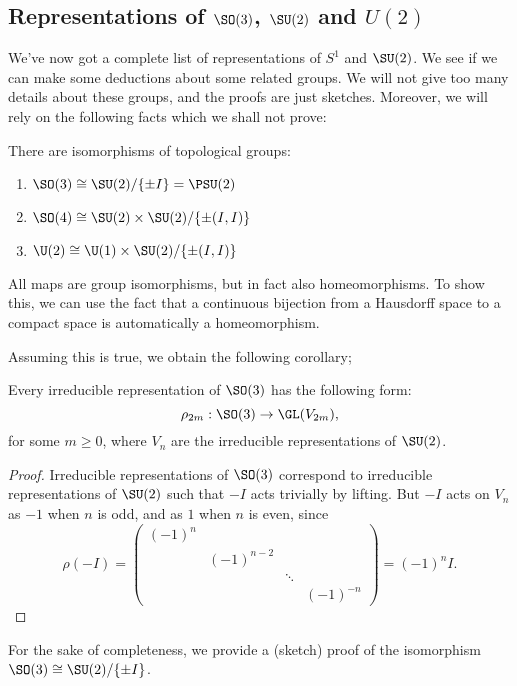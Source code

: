 \documentclass[a4paper]{article}
\begin{document}
\subsection{Representations of \texorpdfstring{$\SO(3)$}{SO(3)}, \texorpdfstring{$\SU(2)$}{SU(2)} and \texorpdfstring{$U(2)$}{U(2)}}
We've now got a complete list of representations of $S^1$ and $\SU(2)$. We see if we can make some deductions about some related groups. We will not give too many details about these groups, and the proofs are just sketches. Moreover, we will rely on the following facts which we shall not prove:

\begin{prop}
  There are isomorphisms of topological groups:
  \begin{enumerate}
    \item $\SO(3) \cong \SU(2)/ \{\pm I\} = \PSU(2)$
    \item $\SO(4) \cong \SU(2) \times \SU(2)/\{\pm (I, I)\}$
    \item $\U(2) \cong \U(1) \times \SU(2) / \{\pm (I, I)\}$
  \end{enumerate}
  All maps are group isomorphisms, but in fact also homeomorphisms. To show this, we can use the fact that a continuous bijection from a Hausdorff space to a compact space is automatically a homeomorphism.
\end{prop}
Assuming this is true, we obtain the following corollary;

\begin{cor}
  Every irreducible representation of $\SO(3)$ has the following form:
  \[
    \rho_{2m}: \SO(3) \to \GL(V_{2m}),
  \]
  for some $m \geq 0$, where $V_n$ are the irreducible representations of $\SU(2)$.
\end{cor}

\begin{proof}
  Irreducible representations of $\SO(3)$ correspond to irreducible representations of $\SU(2)$ such that $-I$ acts trivially by lifting. But $-I$ acts on $V_n$ as $-1$ when $n$ is odd, and as $1$ when $n$ is even, since
  \[
    \rho(-I) =
    \begin{pmatrix}
      (-1)^n\\
      & (-1)^{n - 2}\\
      & & \ddots\\
      & & & (-1)^{-n}
    \end{pmatrix} = (-1)^n I.
  \]
\end{proof}

For the sake of completeness, we provide a (sketch) proof of the isomorphism $\SO(3) \cong \SU(2) / \{\pm I\}$.
\end{document}
